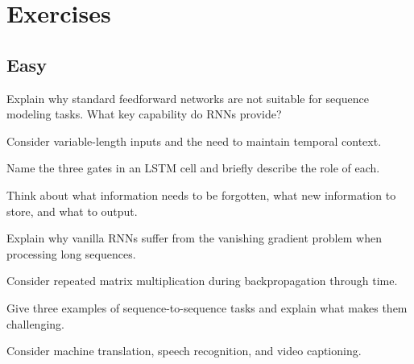 
\section*{Exercises}

\subsection*{Easy}

\begin{exercisebox}[easy]
\begin{problem}
Explain why standard feedforward networks are not suitable for sequence modeling tasks. What key capability do RNNs provide?
\end{problem}
\begin{hintbox}
Consider variable-length inputs and the need to maintain temporal context.
\end{hintbox}
\end{exercisebox}

\begin{exercisebox}[easy]
\begin{problem}
Name the three gates in an LSTM cell and briefly describe the role of each.
\end{problem}
\begin{hintbox}
Think about what information needs to be forgotten, what new information to store, and what to output.
\end{hintbox}
\end{exercisebox}

\begin{exercisebox}[easy]
\begin{problem}
Explain why vanilla RNNs suffer from the vanishing gradient problem when processing long sequences.
\end{problem}
\begin{hintbox}
Consider repeated matrix multiplication during backpropagation through time.
\end{hintbox}
\end{exercisebox}

\begin{exercisebox}[easy]
\begin{problem}
Give three examples of sequence-to-sequence tasks and explain what makes them challenging.
\end{problem}
\begin{hintbox}
Consider machine translation, speech recognition, and video captioning.
\end{hintbox}
\end{exercisebox}


